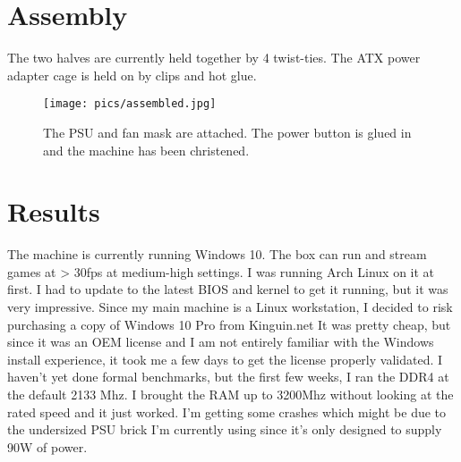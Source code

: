 \documentclass{article}
\begin{document}
\section{Assembly}
The two halves are currently held together by 4 twist-ties. The ATX power adapter cage is held on by clips and hot glue.

\begin{figure}[h]
\texttt{[image: pics/assembled.jpg]}
\caption{The PSU and fan mask are attached. The power button is glued in and the machine has been christened.}
\end{figure}

\section{Results}
The machine is currently running Windows 10. The box can run and stream games at > 30fps at medium-high settings. I was running Arch Linux on it at first. I had to update to the latest BIOS and kernel to get it running, but it was very impressive. Since my main machine is a Linux workstation, I decided to risk purchasing a copy of Windows 10 Pro from Kinguin.net It was pretty cheap, but since it was an OEM license and I am not entirely familiar with the Windows install experience, it took me a few days to get the license properly validated. I haven't yet done formal benchmarks, but the first few weeks, I ran the DDR4 at the default 2133 Mhz. I brought the RAM up to 3200Mhz without looking at the rated speed and it just worked. I'm getting some crashes which might be due to the undersized PSU brick I'm currently using since it's only designed to supply 90W of power.
\end{document}
